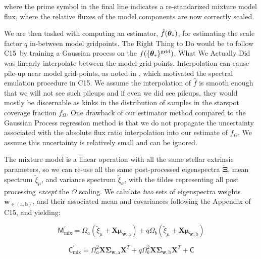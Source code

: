 \documentclass[12pt]{report}
\newcommand{\iancze}{{\sc C15}}
\begin{document}
where the prime symbol in the final line indicates a re-standarized mixture model flux, where the relative fluxes of the model components are now correctly scaled.

We are then tasked with computing an estimator, $\hat f({\bm \theta}_{\ast})$, for estimating the scale factor $q$ in-between model gridpoints.  The Right Thing to Do would be to follow \iancze\ by training a Gaussian process on the $f(\{{\bm \theta}_{\ast}\}^\textrm{grid})$.  What We Actually Did was linearly interpolate between the model grid-points.  Interpolation can cause pile-up near model grid-points, as noted in \citet{cottaar14}, which motivated the spectral emulation procedure in \iancze.  We assume the interpolation of $\hat f$ is smooth enough that we will not see such pileups and if even we did see pileups, they would mostly be discernable as kinks in the distribution of samples in the starspot coverage fraction $f_{\Omega}$.  One drawback of our estimator method compared to the Gaussian Process regression method is that we do not propagate the uncertainty associated with the absolute flux ratio interpolation into our estimate of $f_{\Omega}$.  We assume this uncertainty is relatively small and can be ignored.

The mixture model is a linear operation with all the same stellar extrinsic parameters, so we can re-use all the same post-processed eigenspectra $\widetilde{\mathbf{\Xi}}$, mean spectrum $\widetilde{\xi}_\mu$, and variance spectrum $\widetilde{\xi}_\sigma$, with the tildes representing all post processing \emph{except} the $\Omega$ scaling.  We calulate \emph{two} sets of eigenspectra weights $\mathbf{w}_{\in (\mathrm{a}, \mathrm{b})}$, and their associated mean and covariances following the Appendix of \iancze, and yielding:

\begin{equation}
  \mathsf{M}_{\mathrm{mix}}^\prime = \Omega_a (\widetilde{\xi}_\mu + \mathbf{X} \mathbf{\mu}_{\mathbf{w}, \mathrm{a}}) + q \Omega_b (\widetilde{\xi}_\mu + \mathbf{X} \mathbf{\mu}_{\mathbf{w}, \mathrm{b}})
\end{equation}

\begin{equation}
  \mathsf{C}_{\mathrm{mix}}^\prime = \Omega_a^2 \mathbf{X} \mathbf{\Sigma}_\mathbf{w, \mathrm{a}} \mathbf{X}^T + q \Omega_b^2 \mathbf{X} \mathbf{\Sigma}_\mathbf{w, \mathrm{b}} \mathbf{X}^T + \mathsf{C}
  \label{eqn:modC}
\end{equation}

\end{document}
